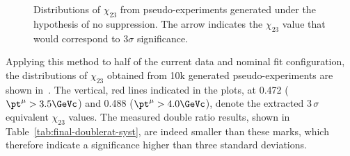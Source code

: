 %
\begin{figure}[hbtp]
  \begin{center}
    \caption{Distributions of $\chi_{23}$ from pseudo-experiments generated under the hypothesis of no suppression.
      The arrow indicates the $\chi_{23}$ value that would correspond to $3\sigma$ significance.
}
    \label{fig:toy_nullhypo}
  \end{center}
\end{figure}

Applying this method to half of the current data and nominal fit configuration, 
the distributions of $\chi_{23}$ obtained from 10k generated pseudo-experiments are shown in~.
The vertical, red lines indicated in the plots, 
at 0.472 ($\pt^\mu>3.5\GeVc$) and 0.488 ($\pt^\mu>4.0\GeVc$), 
denote the extracted $3\,\sigma$ equivalent $\chi_{23}$ values. 
The measured double ratio results, shown in Table~\ref{tab:final-doublerat-syst}, are indeed smaller than these marks, 
which therefore indicate a significance higher than three standard deviations. 


